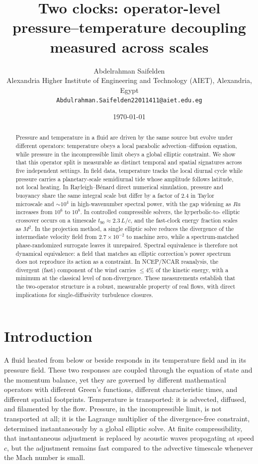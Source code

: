 \documentclass[11pt]{article}
\title{Two clocks: operator-level pressure--temperature decoupling measured across scales}
\author{Abdelrahman Saifelden\\ Alexandria Higher Institute of Engineering and Technology (AIET), Alexandria, Egypt\\ \texttt{Abdulrahman.Saifelden22011411@aiet.edu.eg}}
\date{\today}
\begin{document}
\maketitle

\begin{abstract}
Pressure and temperature in a fluid are driven by the same source but evolve under
different operators: temperature obeys a local parabolic advection--diffusion
equation, while pressure in the incompressible limit obeys a global elliptic
constraint. We show that this operator split is measurable as distinct temporal and
spatial signatures across five independent settings. In field data, temperature
tracks the local diurnal cycle while pressure carries a planetary-scale semidiurnal
tide whose amplitude follows latitude, not local heating. In Rayleigh--B\'enard
direct numerical simulation, pressure and buoyancy share the same integral scale
but differ by a factor of 2.4 in Taylor microscale and $\sim 10^{4}$ in
high-wavenumber spectral power, with the gap widening as $Ra$ increases from
$10^{6}$ to $10^{8}$. In controlled compressible solvers, the hyperbolic-to-
elliptic crossover occurs on a timescale $t_{90} \approx 2.3\,L/c$, and the
fast-clock energy fraction scales as $M^{2}$. In the projection method, a single
elliptic solve reduces the divergence of the intermediate velocity field from
$2.7\times 10^{-2}$ to machine zero, while a spectrum-matched phase-randomized
surrogate leaves it unrepaired. Spectral equivalence is therefore not dynamical
equivalence: a field that matches an elliptic correction's power spectrum does
not reproduce its action as a constraint. In NCEP/NCAR reanalysis, the divergent
(fast) component of the wind carries $\leq 4\%$ of the kinetic energy, with a minimum at
the classical level of non-divergence. These measurements establish that the
two-operator structure is a robust, measurable property of real flows, with direct
implications for single-diffusivity turbulence closures.
\end{abstract}

\section{Introduction}
\label{sec:intro}

A fluid heated from below or beside responds in its temperature field and in its
pressure field. These two responses are coupled through the equation of state and
the momentum balance, yet they are governed by different mathematical operators
with different Green's functions, different characteristic times, and different
spatial footprints. Temperature is transported: it is advected, diffused, and
filamented by the flow. Pressure, in the incompressible limit, is not transported
at all; it is the Lagrange multiplier of the divergence-free constraint,
determined instantaneously by a global elliptic solve. At finite compressibility,
that instantaneous adjustment is replaced by acoustic waves propagating at speed
$c$, but the adjustment remains fast compared to the advective timescale whenever
the Mach number is small.
\end{document}
